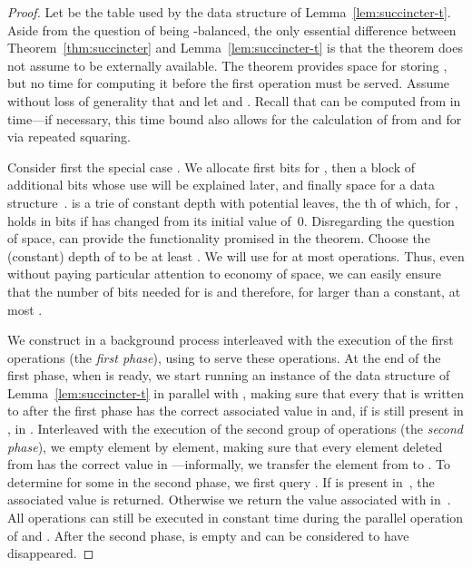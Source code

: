 \documentclass[envcountsame,envcountsect,undated,nolinenumbers]{lnthi}
\begin{document}
\begin{proof}
Let  be the table
used by the data structure
of Lemma~\ref{lem:succincter-t}.
Aside from the question of 
being -balanced,
the only essential difference between 
Theorem~\ref{thm:succincter} and
Lemma~\ref{lem:succincter-t} is that the
theorem does not assume  to be externally
available.
The theorem provides space for storing ,
but no time for computing it before the first
operation must be served.
Assume without loss of generality that 
and let  and .
Recall that 
can be computed from  in  time---if
necessary, this time bound also allows for the calculation
of  from  and 
for  via repeated squaring.

Consider first the special case .
We allocate first  bits for ,
then a block of  additional bits whose use
will be explained later, and finally
space for a data structure~.
 is a trie of constant depth with  potential leaves,
the th of which, for ,
holds  in  bits
if  has changed from its
initial value of~0.
Disregarding the question of space,
 can provide the functionality promised in
the theorem.
Choose the (constant) depth of  to
be at least .
We will use  for at most  operations.
Thus, even without paying particular attention
to economy of space, we can easily ensure
that the number of bits needed for  is
 and
therefore, for  larger than a constant, at most
.

We construct  in a background process
interleaved with the execution of the first
 operations (the \emph{first phase}),
using  to serve these  operations.
At the end of the first phase,
when  is ready, we start running an
instance  of the data structure of
Lemma~\ref{lem:succincter-t} in parallel
with , making sure that every
 that
is written to
after the first phase
has the correct associated value
in  and, if  is still present in ,
in .
Interleaved with the execution of the second
group of  operations (the \emph{second phase}), we empty 
element by element, making
sure that every element deleted from 
has the correct value in ---informally, we transfer the element
from  to .
To determine 
for some  in the second phase,
we first query .
If  is present in~,
the associated value is returned.
Otherwise we return the value
associated with  in~.
All operations can
still be executed
in constant time
during the parallel operation of
 and .
After the second phase, 
is empty and can be considered to have disappeared.


\end{proof}
\end{document}
